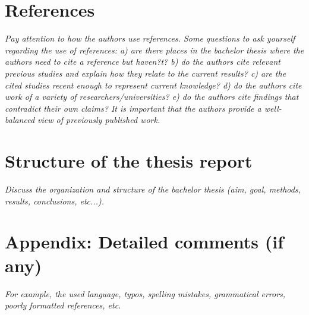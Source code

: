\documentclass[conference]{IEEEtran}
\begin{document}
\section{References}
\textit{Pay attention to how the authors use references. Some questions to ask yourself regarding the use of references: a) are there places in the bachelor thesis where the authors need to cite a reference but haven?t? b) do the authors cite relevant previous studies and explain how they relate to the current results? c) are the cited studies recent enough to represent current knowledge? d) do the authors cite work of a variety of researchers/universities? e) do the authors cite findings that contradict their own claims? It is important that the authors provide a well-balanced view of previously published work.}


\section{Structure of the thesis report}
\textit{Discuss the organization and structure of the bachelor thesis (aim, goal, methods, results, conclusions, etc...).}



\section*{Appendix: Detailed comments (if any)}
\textit{For example, the used language, typos, spelling mistakes, grammatical errors, poorly formatted references, etc. }

\vspace{12pt}
\end{document}
